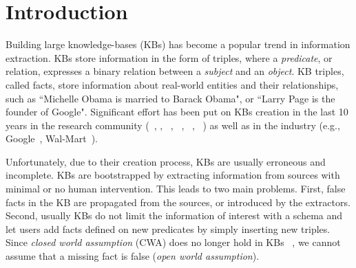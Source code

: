 \section{Introduction}

Building large 
knowledge-bases (KBs) has become a popular trend in information extraction.
KBs store information in the form of triples, where a \emph{predicate}, or relation, expresses a binary relation between a \emph{subject} and an \emph{object}. KB triples, called facts, store information about real-world entities and their relationships, such as %
``Michelle Obama is married to Barack Obama", or ``Larry Page is the founder of Google".
Significant effort has been put on KBs creation in the last 10 years in the research community (~\cite{bizer2009dbpedia}, \cite{bollacker2008freebase}, ~\cite{vrandevcic2014wikidata}, \deepdive~\cite{shin2015incremental}, ~\cite{suchanek2007yago}, 
~\cite{banko2007open}) as well as in the industry %
(e.g., 
Google~\cite{dong2014data}, Wal-Mart~\cite{deshpande2013building}).

Unfortunately, due to their creation process, KBs are usually erroneous and incomplete.
KBs are bootstrapped by extracting information from sources 
with minimal or no human intervention.  This leads to two main problems. First, false facts in the KB are propagated from the sources, or introduced by the extractors. Second, usually KBs do not limit the information of interest with a schema
and let users add facts defined on new predicates by simply inserting new triples. %
Since \emph{closed world assumption} (CWA) does no longer hold in KBs ~\cite{dong2014data,galarraga2015fast}, we cannot assume that a missing fact is false %
(\emph{open world assumption}).


